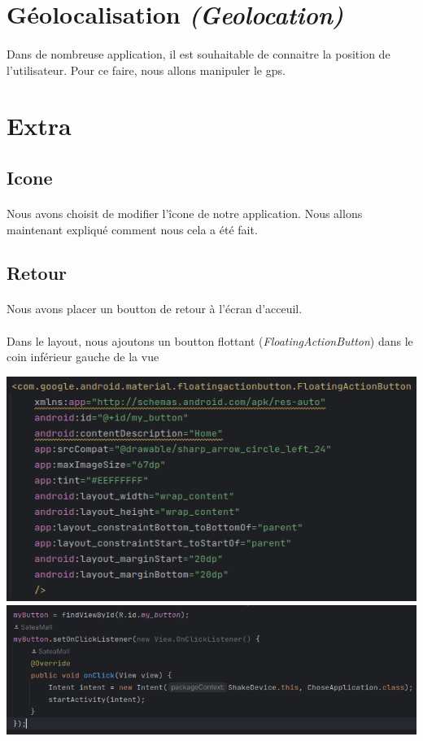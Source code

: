 \documentclass[a4paper]{article}
\begin{document}
\begin{multicols}{2}
        \section{Géolocalisation \emph{(Geolocation)}}
            \paragraph{}
                Dans de nombreuse application, il est souhaitable de connaitre la position de l'utilisateur. Pour ce faire, nous allons manipuler le gps.
        \section{Extra}
            \subsection{Icone}
                \paragraph{}
                    Nous avons choisit de modifier l'îcone de notre application. Nous allons maintenant expliqué comment nous cela a été fait.
            \subsection{Retour}
                \paragraph{}
                    Nous avons placer un boutton de retour à l'écran d'acceuil.
                    
                \paragraph{}
                    Dans le layout, nous ajoutons un boutton flottant (\emph{FloatingActionButton}) dans le coin inférieur gauche de la vue

                    \noindent\includegraphics[width=.49\textwidth]{button/boutton}
                    \includegraphics[width=.49\textwidth]{button/onClick}

    \end{multicols}
\end{document}
